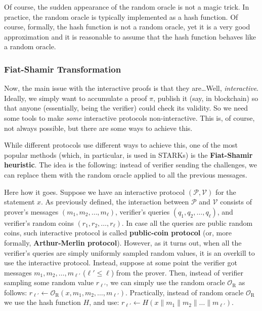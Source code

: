 \documentclass[../lecture-notes.tex]{subfiles}
\begin{document}
\begin{remark}
    Of course, the sudden appearance of the random oracle is not a magic trick. In practice, the random oracle is typically implemented as a hash function. Of course, formally, the hash function is not a random oracle, yet it is a very good approximation and it is reasonable to assume that the hash function behaves like a random oracle.
\end{remark}

\subsubsection{Fiat-Shamir Transformation}

Now, the main issue with the interactive proofs is that they are\ldots Well, \textit{interactive}. Ideally, we simply want to accumulate a proof $\pi$, publish it (say, in blockchain) so that anyone (essentially, being the verifier) could check its validity. So we need some tools to make \textit{some} interactive protocols non-interactive. This is, of course, not always possible, but there are some ways to achieve this.

While different protocols use different ways to achieve this, one of the most popular methods (which, in particular, is used in STARKs) is the \textbf{Fiat-Shamir heuristic}. The idea is the following: instead of verifier sending the challenges, we can replace them with the random oracle applied to all the previous messages. 

Here how it goes. Suppose we have an interactive protocol $(\mathcal{P}, \mathcal{V})$ for the statement $x$. As previously defined, the interaction between $\mathcal{P}$ and $\mathcal{V}$ consists of prover's messages $(m_1,m_2,\dots,m_{\ell})$, verifier's queries $(q_1,q_2,\dots,q_{\ell})$, and verifier's random coins $(r_1,r_2,\dots,r_{\ell})$. In case all the queries are public random coins, such interactive protocol is called \textbf{public-coin protocol} (or, more formally, \textbf{Arthur-Merlin protocol}). However, as it turns out, when all the verifier's queries are simply uniformly sampled random values, it is an overkill to use the interactive protocol. Instead, suppose at some point the verifier got messages $m_1,m_2,\dots,m_{\ell'}$ ($\ell' \leq \ell$) from the prover. Then, instead of verifier sampling some random value $r_{\ell'}$, we can simply use the random oracle $\mathcal{O}_{\text{R}}$ as follows: $r_{\ell'} \gets \mathcal{O}_{\text{R}}(x,m_1,m_2,\dots,m_{\ell'})$. Practically, instead of random oracle $\mathcal{O}_{\text{R}}$ we use the hash function $H$, and use: $r_{\ell'} \gets H(x \parallel m_1 \parallel m_2 \parallel \dots \parallel m_{\ell'})$.
\end{document}
